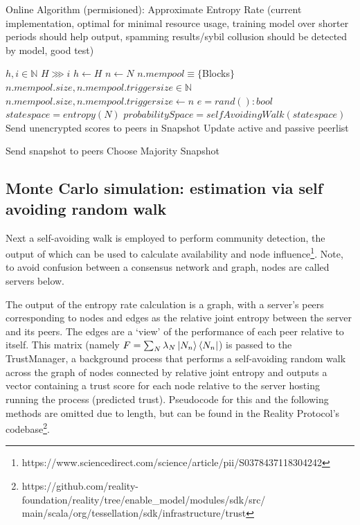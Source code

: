 \documentclass{article}
\begin{document}
\begin{algorithm}
\caption{Online Algorithm (permisioned): Approximate Entropy Rate (current implementation, optimal for minimal resource usage, training model over shorter periods should help output, spamming results/sybil collusion should be detected by model, good test)}\label{alg:cap}
\begin{algorithmic}
\State $h, i \in \mathbb{N}$
\State $H \ggg  i$
\State $h \gets H$
\State $n \gets N$ 
\State $n.mempool \equiv \{ $Blocks$ \}$
\State $n.mempool.size, n.mempool.triggersize \in \mathbb{N}$
\State  $n.mempool.size, n.mempool.triggersize \gets n$ 
\State $e = rand(): bool $ 
		 \State $state space = entropy(N)$ 
   	 	\State $probabilitySpace = selfAvoidingWalk (state space)$  
	 	\State Send unencrypted scores to peers in Snapshot
	 	\State Update active and passive peerlist
		
			\State Send snapshot to peers
			\State Choose Majority Snapshot
	\EndIf
\EndWhile
\end{algorithmic}
\end{algorithm}

\subsection{Monte Carlo simulation: estimation via self avoiding random walk}
Next a self-avoiding walk is employed to perform community detection, the output of which can be used to calculate availability and node influence\footnote{https://www.sciencedirect.com/science/article/pii/S0378437118304242}. Note, to avoid confusion between a consensus network and graph, nodes are called servers below.

The output of the entropy rate calculation is a graph, with a server’s peers corresponding to nodes and edges as the relative joint entropy between the server and its peers. The edges are a ‘view’ of the performance of each peer relative to itself. This matrix (namely $F = \sum_N \lambda_N \ket{N_n} \bra{N_n}$) is passed to the TrustManager, a background process that performs a self-avoiding random walk across the graph of nodes connected by relative joint entropy and outputs a vector containing a trust score for each node relative to the server hosting running the process (predicted trust). Pseudocode for this and the following methods are omitted due to length, but can be found in the Reality Protocol's codebase\footnote{https://github.com/reality-foundation/reality/tree/enable\_model/modules/sdk/src/\\main/scala/org/tessellation/sdk/infrastructure/trust}.
\end{document}
